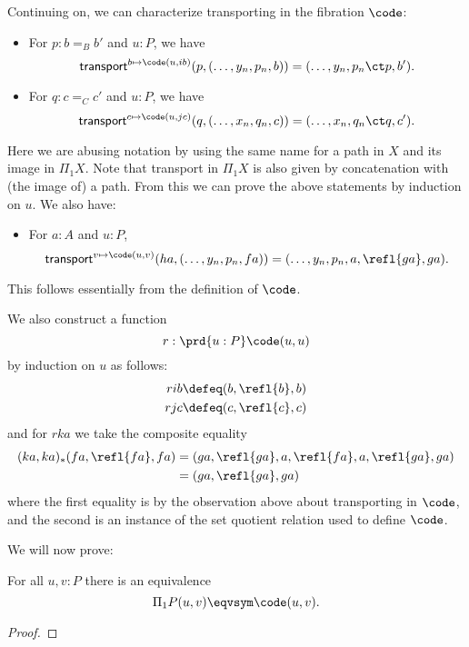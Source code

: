 {Continuing on, we can characterize transporting in the fibration $\code$:
\begin{itemize}
\item For $p:b=_B b'$ and $u:P$, we have
  \[ \mathsf{transport}^{b\mapsto \code(u,ib)}(p, (\dots, y_n,p_n,b))
  = (\dots,y_n,p_n\ct p,b').
  \]
\item For $q:c=_C c'$ and $u:P$, we have
  \[ \mathsf{transport}^{c\mapsto \code(u,jc)}(q, (\dots, x_n,q_n,c))
  = (\dots,x_n,q_n\ct q,c').
  \]
\end{itemize}
Here we are abusing notation by using the same name for a path in $X$ and its image in $\Pi_1X$.
Note that transport in $\Pi_1X$ is also given by concatenation with (the image of) a path.
From this we can prove the above statements by induction on $u$.
We also have:
\begin{itemize}
\item For $a:A$ and $u:P$,
  \[ \mathsf{transport}^{v\mapsto \code(u,v)}(ha, (\dots, y_n,p_n,fa))
  = (\dots,y_n,p_n,a,\refl{ga},ga).
  \]
\end{itemize}
This follows essentially from the definition of $\code$.

We also construct a function
\[ r : \prd{u:P} \code(u,u) \]
by induction on $u$ as follows:
\begin{align*}
  rib &\defeq (b,\refl{b},b)\\
  rjc &\defeq (c,\refl{c},c)
\end{align*}
and for $rka$ we take the composite equality
\begin{align*}
  (ka,ka)_* (fa,\refl{fa},fa)
  &= (ga,\refl{ga},a,\refl{fa},a,\refl{ga},ga) \\
  &= (ga,\refl{ga},ga)
\end{align*}
where the first equality is by the observation above about transporting in $\code$, and the second is an instance of the set quotient relation used to define $\code$.

We will now prove:
\begin{thm}\label{thm:naive-van-kampen}
  For all $u,v:P$ there is an equivalence
  \[ \Pi_1P(u,v) \eqvsym \code(u,v). \]
\end{thm}
\begin{proof}


\end{proof}}
